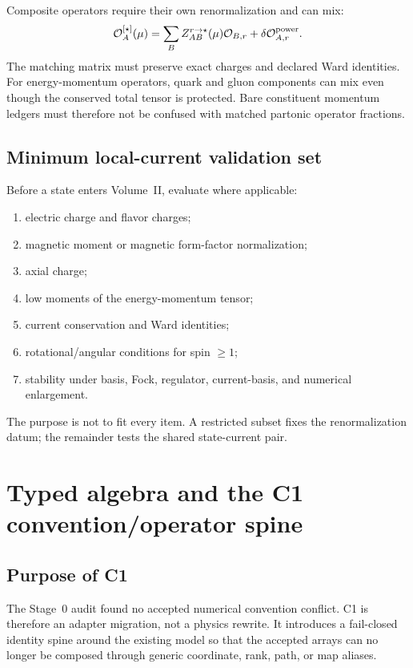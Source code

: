 \documentclass[11pt]{article}
\newcommand{\cO}{\mathcal O}
\begin{document}
Composite operators require their own renormalization and can mix:
\begin{equation}
 \cO_{A}^{[\star]}(\mu)
 =\sum_B Z_{AB}^{r\to\star}(\mu)
 \cO_{B,r}+\delta\cO_{A,r}^{\rm power}.
\label{eq:local-operator-renormalization}
\end{equation}
The matching matrix must preserve exact charges and declared Ward identities.
For energy-momentum operators, quark and gluon components can mix even though
the conserved total tensor is protected.  Bare constituent momentum ledgers
must therefore not be confused with matched partonic operator fractions.

\subsection{Minimum local-current validation set}

Before a state enters Volume~II, evaluate where applicable:
\begin{enumerate}
\item electric charge and flavor charges;
\item magnetic moment or magnetic form-factor normalization;
\item axial charge;
\item low moments of the energy-momentum tensor;
\item current conservation and Ward identities;
\item rotational/angular conditions for spin \(\ge1\);
\item stability under basis, Fock, regulator, current-basis, and numerical
enlargement.
\end{enumerate}
The purpose is not to fit every item.  A restricted subset fixes the
renormalization datum; the remainder tests the shared state-current pair.

\section{Typed algebra and the C1 convention/operator spine}
\label{sec:c1-spine}

\subsection{Purpose of C1}

The Stage~0 audit found no accepted numerical convention conflict.  C1 is
therefore an adapter migration, not a physics rewrite.  It introduces a
fail-closed identity spine around the existing model so that the accepted
arrays can no longer be composed through generic coordinate, rank, path, or
map aliases.
\end{document}
